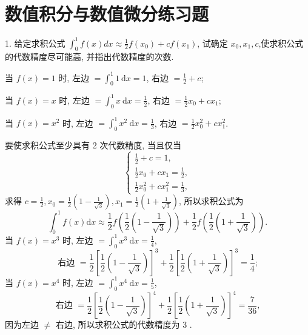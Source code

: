 \newpage
\section{数值积分与数值微分练习题}

\begin{tcolorbox}[breakable,enhanced,arc=0mm,outer arc=0mm,
		boxrule=0pt,toprule=1pt,leftrule=0pt,bottomrule=1pt, rightrule=0pt,left=0.2cm,right=0.2cm,
		titlerule=0.5em,toptitle=0.1cm,bottomtitle=-0.1cm,top=0.2cm,
		colframe=white!10!biru,colback=white!90!biru,coltitle=white,
            coltext=black,title =2024-05, title style={white!10!biru}, before skip=8pt, after skip=8pt,before upper=\hspace{2em},
		fonttitle=\bfseries,fontupper=\normalsize]

 1. 给定求积公式 $ \displaystyle\int_{0}^{1} f(x) d x \approx \frac{1}{2} f\left(x_{0}\right)+c f\left(x_{1}\right) $, 试确定 $ x_{0}, x_{1}, c $,使求积公式的代数精度尽可能高, 并指出代数精度的次数.

 \tcblower
  当 $ f(x)=1 $ 时, 左边 $ =\int_{0}^{1} 1 \mathrm{~d} x=1 $, 右边 $ =\frac{1}{2}+c $;
  
  当 $ f(x)=x $ 时, 左边 $ =\int_{0}^{1} x \mathrm{~d} x=\frac{1}{2} $, 右边 $ =\frac{1}{2} x_{0}+c x_{1} $;
  
  当 $ f(x)=x^{2} $ 时, 左边 $ =\int_{0}^{1} x^{2} \mathrm{~d} x=\frac{1}{3} $, 右边 $ =\frac{1}{2} x_{0}^{2}+c x_{1}^{2} $.
  
  要使求积公式至少具有 2 次代数精度, 当且仅当
$$
\left\{\begin{array}{l}
\frac{1}{2}+c=1, \\
\frac{1}{2} x_{0}+c x_{1}=\frac{1}{2}, \\
\frac{1}{2} x_{0}^{2}+c x_{1}^{2}=\frac{1}{3},
\end{array}\right.
$$
求得 $ c=\frac{1}{2}, x_{0}=\frac{1}{2}\left(1-\frac{1}{\sqrt{3}}\right), x_{1}=\frac{1}{2}\left(1+\frac{1}{\sqrt{3}}\right) $, 所以求积公式为
$$
\int_{0}^{1} f(x) \mathrm{d} x \approx \frac{1}{2} f\left(\frac{1}{2}\left(1-\frac{1}{\sqrt{3}}\right)\right)+\frac{1}{2} f\left(\frac{1}{2}\left(1+\frac{1}{\sqrt{3}}\right)\right) .
$$
当 $ f(x)=x^{3} $ 时, 左边 $ =\int_{0}^{1} x^{3} \mathrm{~d} x=\frac{1}{4} $,
$$
\text { 右边 }=\frac{1}{2}\left[\frac{1}{2}\left(1-\frac{1}{\sqrt{3}}\right)\right]^{3}+\frac{1}{2}\left[\frac{1}{2}\left(1+\frac{1}{\sqrt{3}}\right)\right]^{3}=\frac{1}{4} \text {; }
$$
当 $ f(x)=x^{4} $ 时, 左边 $ =\int_{0}^{1} x^{4} \mathrm{~d} x=\frac{1}{5} $,
$$
\text { 右边 }=\frac{1}{2}\left[\frac{1}{2}\left(1-\frac{1}{\sqrt{3}}\right)\right]^{4}+\frac{1}{2}\left[\frac{1}{2}\left(1+\frac{1}{\sqrt{3}}\right)\right]^{4}=\frac{7}{36} \text {, }
$$
因为左边 $ \neq $ 右边, 所以求积公式的代数精度为 3 .
\end{tcolorbox}

